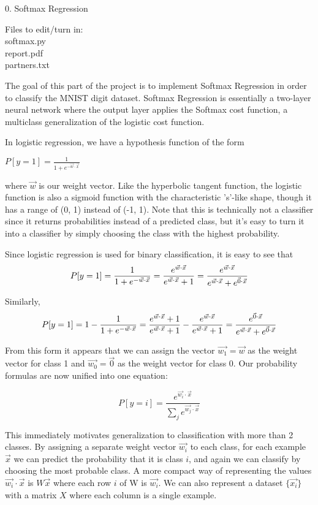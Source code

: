 \documentclass[]{article}
\begin{document}
0. Softmax Regression

Files to edit/turn in:\\
softmax.py\\
report.pdf\\
partners.txt

The goal of this part of the project is to implement Softmax Regression in 
order to classify the MNIST digit dataset. Softmax Regression is essentially a 
two-layer neural network where the output layer applies the Softmax cost 
function, a multiclass generalization of the logistic cost function. 

In logistic regression, we have a hypothesis function of the form

$P[y = 1] = \frac{1}{1+e^{-\vec{w}\cdot\vec{x}}}$

where $\vec{w}$ is our weight vector. Like the hyperbolic tangent function, the 
logistic function is also a sigmoid function with the characteristic 's'-like 
shape, though it has a range of (0, 1) instead of (-1, 1). Note that this is 
technically not a classifier since it returns probabilities instead of a predicted 
class, but it's easy to turn it into a classifier by simply choosing the class with 
the highest probability.

Since logistic regression is used for binary classification, it is easy to see 
that
$$P[y = 1] = \frac{1}{1+e^{-\vec{w}\cdot\vec{x}}} \\
      = \frac{e^{\vec{w}\cdot\vec{x}}}{e^{\vec{w}\cdot\vec{x}}+1} \\
      = 
      \frac{e^{\vec{w}\cdot\vec{x}}}{e^{\vec{w}\cdot\vec{x}}+e^{\vec{0}\cdot\vec{x}}}$$

Similarly, 
$$P[y = 1] = 1 - \frac{1}{1+e^{-\vec{w}\cdot\vec{x}}} \\
         = \frac{e^{\vec{w}\cdot\vec{x}}+1}{e^{\vec{w}\cdot\vec{x}}+1} - 
         \frac{e^{\vec{w}\cdot\vec{x}}}{e^{\vec{w}\cdot\vec{x}}+1} \\
         = 
\frac{e^{\vec{0}\cdot\vec{x}}}{e^{\vec{w}\cdot\vec{x}}+e^{\vec{0}\cdot\vec{x}}}$$

From this form it appears that we can assign the vector $\vec{w_1} = \vec{w}$ 
as the weight vector for class 1 and $\vec{w_0} = \vec{0}$ as the weight vector 
for class 0. Our probability formulas are now unified into one equation:

$$P[y = i] = \frac{e^{\vec{w_i}\cdot\vec{x}}}{\sum_{j}e^{\vec{w_j}\cdot\vec{x}}}$$

This immediately motivates generalization to classification with more than 2 classes. 
By assigning a separate weight vector $\vec{w_i}$ to each class, for each example 
$\vec{x}$ we can predict the probability that it is class $i$, and again we can
classify by choosing the most probable class. A more compact way of representing the
values $\vec{w_i}\cdot\vec{x}$ is $W \vec{x}$ where each row $i$ of W is $\vec{w_i}$.
We can also represent a dataset $\{\vec{x_i}\}$ with a matrix $X$ where each column is
a single example.
\end{document}
